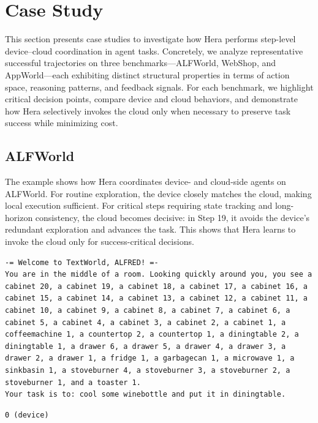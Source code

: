 \documentclass{article}
\newcommand{\name}{Hera\xspace}
\begin{document}
\section{Case Study}
\label{appendix:case}
This section presents case studies to investigate how \name performs step-level device--cloud coordination in agent tasks.
Concretely, we analyze representative successful trajectories on three benchmarks—ALFWorld, WebShop, and AppWorld—each exhibiting distinct structural properties in terms of action space, reasoning patterns, and feedback signals. For each benchmark, we highlight critical decision points, compare device and cloud behaviors, and demonstrate how \name selectively invokes the cloud only when necessary to preserve task success while minimizing cost.

\subsection{ALFWorld}
The example shows how \name coordinates device- and cloud-side agents on ALFWorld. For routine exploration, the device closely matches the cloud, making local execution sufficient. For critical steps requiring state tracking and long-horizon consistency, the cloud becomes decisive: in Step 19, it avoids the device’s redundant exploration and advances the task. This shows that \name learns to invoke the cloud only for success-critical decisions.

\begin{envbox}[title=Step 1: environment]
\begin{lstlisting}[style=mytt]
-= Welcome to TextWorld, ALFRED! =-
You are in the middle of a room. Looking quickly around you, you see a cabinet 20, a cabinet 19, a cabinet 18, a cabinet 17, a cabinet 16, a cabinet 15, a cabinet 14, a cabinet 13, a cabinet 12, a cabinet 11, a cabinet 10, a cabinet 9, a cabinet 8, a cabinet 7, a cabinet 6, a cabinet 5, a cabinet 4, a cabinet 3, a cabinet 2, a cabinet 1, a coffeemachine 1, a countertop 2, a countertop 1, a diningtable 2, a diningtable 1, a drawer 6, a drawer 5, a drawer 4, a drawer 3, a drawer 2, a drawer 1, a fridge 1, a garbagecan 1, a microwave 1, a sinkbasin 1, a stoveburner 4, a stoveburner 3, a stoveburner 2, a stoveburner 1, and a toaster 1.
Your task is to: cool some winebottle and put it in diningtable.
\end{lstlisting}
\end{envbox}

\begin{herabox}[title=Step 1: Hera decision]
\begin{lstlisting}[style=mytt]
0 (device)
\end{lstlisting}
\end{herabox}
\end{document}
